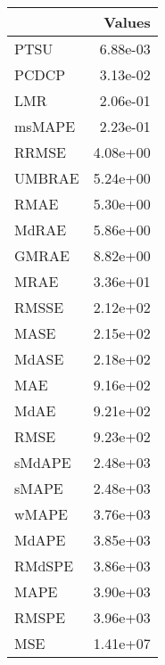\begin{tabular}{lr}
\toprule
 & Values \\
\midrule
PTSU & 6.88e-03 \\
PCDCP & 3.13e-02 \\
LMR & 2.06e-01 \\
msMAPE & 2.23e-01 \\
RRMSE & 4.08e+00 \\
UMBRAE & 5.24e+00 \\
RMAE & 5.30e+00 \\
MdRAE & 5.86e+00 \\
GMRAE & 8.82e+00 \\
MRAE & 3.36e+01 \\
RMSSE & 2.12e+02 \\
MASE & 2.15e+02 \\
MdASE & 2.18e+02 \\
MAE & 9.16e+02 \\
MdAE & 9.21e+02 \\
RMSE & 9.23e+02 \\
sMdAPE & 2.48e+03 \\
sMAPE & 2.48e+03 \\
wMAPE & 3.76e+03 \\
MdAPE & 3.85e+03 \\
RMdSPE & 3.86e+03 \\
MAPE & 3.90e+03 \\
RMSPE & 3.96e+03 \\
MSE & 1.41e+07 \\
\bottomrule
\end{tabular}
